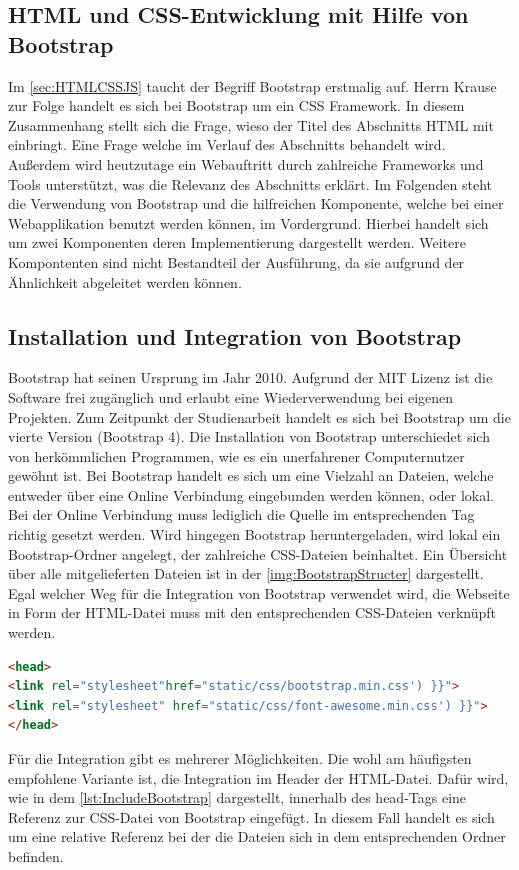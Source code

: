 \documentclass[a4paper,titlepage,halfparskip,12pt]{scrreprt}
\begin{document}
\begin{onehalfspacing}
\section{HTML und CSS-Entwicklung mit Hilfe von Bootstrap}
\label{sec:Bootstrap}
Im \autoref{sec:HTMLCSSJS} taucht der Begriff Bootstrap erstmalig auf. Herrn Krause zur Folge handelt es sich bei Bootstrap um ein \ac{CSS} Framework. In diesem Zusammenhang stellt sich die Frage, wieso der Titel des Abschnitts \ac{HTML} mit einbringt. Eine Frage welche im Verlauf des Abschnitts behandelt wird. Außerdem wird heutzutage ein Webauftritt durch zahlreiche Frameworks und Tools unterstützt, was die Relevanz des Abschnitts erklärt. Im Folgenden steht die Verwendung von Bootstrap und die hilfreichen Komponente, welche bei einer Webapplikation benutzt werden können, im Vordergrund. Hierbei handelt sich um zwei Komponenten deren Implementierung dargestellt werden. Weitere Kompontenten sind nicht Bestandteil der Ausführung, da sie aufgrund der Ähnlichkeit abgeleitet werden können. 

\subsection*{Installation und Integration von Bootstrap}
Bootstrap hat seinen Ursprung im Jahr 2010. Aufgrund der MIT Lizenz ist die Software frei zugänglich und erlaubt eine Wiederverwendung bei eigenen Projekten. Zum Zeitpunkt der Studienarbeit handelt es sich bei Bootstrap um die vierte Version (Bootstrap 4).\cite{bootstrapOnline}
Die Installation von Bootstrap unterschiedet sich von herkömmlichen Programmen, wie es ein unerfahrener Computernutzer gewöhnt ist. Bei Bootstrap handelt es sich um eine Vielzahl an Dateien, welche entweder über eine Online Verbindung eingebunden werden können, oder lokal. Bei der Online Verbindung muss lediglich die Quelle im entsprechenden Tag richtig gesetzt werden. Wird hingegen Bootstrap heruntergeladen, wird lokal ein Bootstrap-Ordner angelegt, der zahlreiche CSS-Dateien beinhaltet. Ein Übersicht über alle mitgelieferten Dateien ist in der \autoref{img:BootstrapStructer} dargestellt. Egal welcher Weg für die Integration von Bootstrap verwendet wird, die Webseite in Form der HTML-Datei muss mit den entsprechenden CSS-Dateien verknüpft werden.
\begin{lstlisting}[language=HTML,caption=Importieren der Bootstrap-Dateien,label={lst:IncludeBootstrap}]
<head>
<link rel="stylesheet"href="static/css/bootstrap.min.css') }}">
<link rel="stylesheet" href="static/css/font-awesome.min.css') }}">
</head>
\end{lstlisting}
Für die Integration gibt es mehrerer Möglichkeiten. Die wohl am häufigsten empfohlene Variante ist, die Integration im Header der HTML-Datei. Dafür wird, wie in dem \autoref{lst:IncludeBootstrap} dargestellt, innerhalb des head-Tags eine Referenz zur CSS-Datei von Bootstrap eingefügt. In diesem Fall handelt es sich um eine relative Referenz bei der die Dateien sich in dem entsprechenden Ordner befinden. \cite{krause2016introducing}


\end{onehalfspacing}
\end{document}
